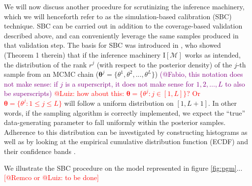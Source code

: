 \documentclass[oneside]{article}
\begin{document}
We will now discuss another procedure for scrutinizing the inference machinery, which we will henceforth refer to as the simulation-based calibration (SBC) technique.
SBC can be carried out in addition to the coverage-based validation described above, and can conveniently leverage the same samples produced in that validation step.
The basis for SBC was introduced in \cite{Talts2018}, who showed (Theorem 1 therein) that if the inference machinery $\text{I}[\mathcal{M}]$ works as intended, the distribution of the rank $r^j$ (with respect to the posterior density)
of the $j$-th sample from an MCMC chain ($\boldsymbol{\theta}^j = \{\theta^1, \theta^2, ..., \theta^L\}$) \textcolor{purple}{(@Fabio, this notation does not make sense: if $j$ is a superscript, it does not make sense for $1, 2,\ldots, L$ to also be superscripts)}
\textcolor{red}{@Luiz: how about this: $\boldsymbol{\theta} = \{\theta^j: j \in [1, L]\}$? Or $\boldsymbol{\theta} = \{\theta^j: 1 \leq j \leq L\}$ } will follow a uniform distribution on $[1, L + 1]$.
In other words, if the sampling algorithm is correctly implemented, we expect the ``true'' data-generating parameter to fall uniformly within the posterior samples.
Adherence to this distribution can be investigated by constructing histograms \citep{Talts2018} as well as by looking at the empirical cumulative distribution function (ECDF) and their confidence bands \citep{Sailynoja2021}.

We illustrate the SBC procedure on the model represented in figure
\ref{fig:pgm}... \textcolor{red}{[@Remco or @Luiz: to be done]}
\end{document}
